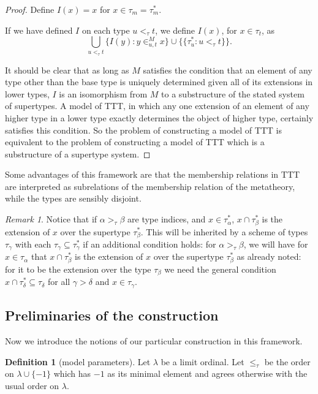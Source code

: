\documentclass{article}
\newif\ifshowannotations
\newcommand{\annot}[1]{\ifshowannotations\marginpar{#1}\fi}
\theoremstyle{definition}
\newtheorem{definition}[theorem]{Definition}
\theoremstyle{remark}
\newtheorem{remark}[theorem]{Remark}
\begin{document}
{\begin{proof}
Define $I(x) = x$ for $x \in \tau_m = \tau^*_m$.

If we have defined $I$ on each type $u <_\tau t$, we define $I(x)$, for $x \in \tau_t$, as
$$\bigcup_{u <_\tau t} \{I(y):y \in^M_{u,t} x\} \cup \{\{\tau^*_u:u <_\tau t\}\}.$$

It should be clear that as long as $M$ satisfies the condition that an element of any type other than the base type is uniquely determined given all of its extensions in lower types, $I$ is an isomorphism from $M$ to a substructure of the stated system of supertypes.  A model of TTT, in which any one extension of an element of any higher type in a lower type exactly determines the object of higher type, certainly satisfies this condition.  So the problem of constructing a model of TTT is equivalent to the problem of constructing a model of TTT which is a substructure of a supertype system.
\end{proof}

Some advantages of this framework are that the membership relations in TTT are interpreted as subrelations of the membership relation of the metatheory, while the types are sensibly disjoint.

\begin{remark}
Notice that if $\alpha>_\tau \beta$ are type indices, and $x \in \tau^*_\alpha$, $x \cap \tau^*_\beta$ is the extension of $x$ over the supertype $\tau_\beta^*$.  This will be inherited by a scheme of types $\tau_\gamma$ with each $\tau_\gamma \subseteq \tau^*_\gamma$ if an additional condition holds:  for $\alpha>_\tau\beta$, we will have
for $x \in \tau_\alpha$ that $x \cap \tau^*_\beta$ is the extension of $x$ over the supertype $\tau_\beta^*$ as already noted:  for it to be the extension over the type $\tau_\beta$ we need the general condition $x \cap \tau^*_\delta \subseteq \tau_\delta$ for all $\gamma>\delta$ and $x \in \tau_\gamma$.
\end{remark}

\subsection{Preliminaries of the construction}
\label{ss:preliminaries}

Now we introduce the notions of our particular construction in this framework.
\begin{definition}[model parameters]\label{def:model_params}
Let $\lambda$ be a limit ordinal.  Let $\leq_\tau$ be the order on $\lambda \cup \{-1\}$ which has $-1$ as its minimal element and agrees otherwise with the usual order on $\lambda$.


\end{definition}}
\end{document}
